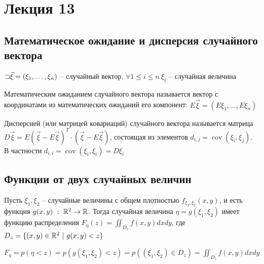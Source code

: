 \documentclass[12pt]{article}
\begin{document}
    \section{Лекция 13}

    \subsection{Математическое ожидание и дисперсия случайного вектора}
    
    $\mathord{\sqsupset} \vec{\xi} = (\xi_1, \dots, \xi_n)$ -- случайный вектор, 
    $\forall 1 \leq i \leq n \ \xi_i$ -- случайная величина

    \Def Математическим ожиданием случайного вектора называется вектор с координатами 
    из математических ожиданий его компонент: $E\vec{\xi} = (E\xi_1, \dots, E\xi_n)$

    \Def Дисперсией (или матрицей ковариаций) случайного вектора называется матрица
    $D\vec{\xi} = E(\vec{\xi} - E\vec{\xi})^T \cdot (\vec{\xi} - E\vec{\xi})$, состоящая
    из элементов $d_{i, j} = \operatorname{cov} (\xi_i, \xi_j)$. В частности $d_{i, i} = \operatorname{cov} (\xi_i, \xi_i) = D\xi_i$

    \subsection{Функции от двух случайных величин}

    \hypertarget{functionoftworandomvariables}{}

    \begin{MyTheorem}
        \Ths Пусть $\xi_1, \xi_2$ -- случайные величины с общем плотностью $f_{\xi_1, \xi_2}(x, y)$, и есть функция
        $g(x, y) \ : \ \mathbb{R}^2 \rightarrow \mathbb{R}$. Тогда случайная величина $\eta = g(\xi_1, \xi_2)$ имеет
        функцию распределения $F_{\eta}(z) = \iint_{D_z} f(x, y)dxdy$, 
        где $D_z = \{(x, y) \in \mathbb{R}^2 \ | \ g(x, y) < z\}$
    \end{MyTheorem}

    \begin{MyProof}
        $F_\eta = p(\eta < z) = p(g(\xi_1, \xi_2) < z) = p((\xi_1, \xi_2) \in D_z) = \iint_{D_z} f(x, y) dxdy$
    \end{MyProof}
\end{document}
